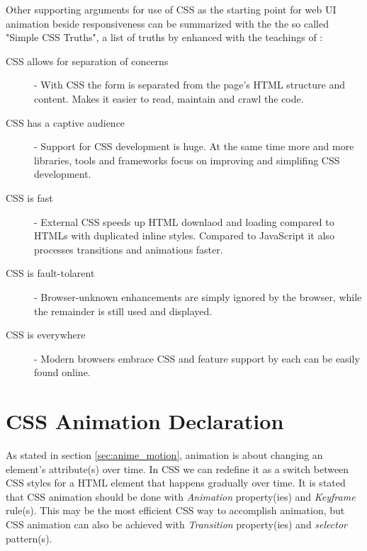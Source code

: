 Other supporting arguments for use of CSS as the starting point for web UI animation beside responsiveness can be summarized with the the so called "Simple CSS Truths", a list of truths by \citet{palermoCSS} enhanced with the teachings of \citet{IAWEB}:

\begin{description}
\item [CSS allows for separation of concerns] -
 With CSS the form is separated from the page's HTML structure and content. Makes it easier to read, maintain and crawl the code.

\item [CSS has a captive audience] -
 Support for CSS development is huge. At the same time more and more libraries, tools and frameworks focus on improving and simplifing CSS development. 

\item [CSS is fast] - 
 External CSS speeds up HTML downlaod and loading compared to HTMLs with duplicated inline styles. Compared to JavaScript it also processes transitions and animations faster.

\item [CSS is fault-tolarent] - 
 Browser-unknown enhancements are simply ignored by the browser, while the remainder is still used and displayed.

\item [CSS is everywhere] - 
 Modern browsers embrace CSS and feature support by each can be easily found online.
\end{description}


\section{CSS Animation Declaration} %
\label{sec:declarationCSS}

As stated in section \ref{sec:anime_motion}, animation is about changing an element's attribute(s) over time. In CSS we can redefine it as a switch between CSS styles for a HTML element that happens gradually over time. It is stated that CSS animation should be done with {\em{}Animation} property(ies) and {\em{}Keyframe} rule(s). This may be the most efficient CSS way to accomplish animation, but CSS animation can also be achieved with {\em{}Transition} property(ies) and {\em{}selector} pattern(s)\citep{w3schoolAnime,w3schoolTrans}.


\label{sub:CSS_animation_keyframe}

